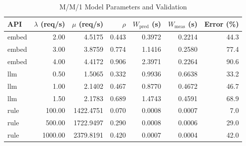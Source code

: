 \begin{table}[htbp]
    \centering
    \caption{M/M/1 Model Parameters and Validation}
    \label{tab:mm1}
    \begin{tabular}{@{}lrrrrrr@{}}
        \toprule
        API & $\lambda$ (req/s) & $\mu$ (req/s) & $\rho$ & $W_{\text{pred}}$ (s) & $W_{\text{meas}}$ (s) & Error (\%) \\
        \midrule
        embed & 2.00 & 4.5175 & 0.443 & 0.3972 & 0.2214 & 44.3 \\
        embed & 3.00 & 3.8759 & 0.774 & 1.1416 & 0.2580 & 77.4 \\
        embed & 4.00 & 4.4172 & 0.906 & 2.3971 & 0.2264 & 90.6 \\
        llm & 0.50 & 1.5065 & 0.332 & 0.9936 & 0.6638 & 33.2 \\
        llm & 1.00 & 2.1402 & 0.467 & 0.8770 & 0.4672 & 46.7 \\
        llm & 1.50 & 2.1783 & 0.689 & 1.4743 & 0.4591 & 68.9 \\
        rule & 100.00 & 1422.4751 & 0.070 & 0.0008 & 0.0007 & 7.0 \\
        rule & 500.00 & 1722.9497 & 0.290 & 0.0008 & 0.0006 & 29.0 \\
        rule & 1000.00 & 2379.8191 & 0.420 & 0.0007 & 0.0004 & 42.0 \\
        \bottomrule
    \end{tabular}
\end{table}